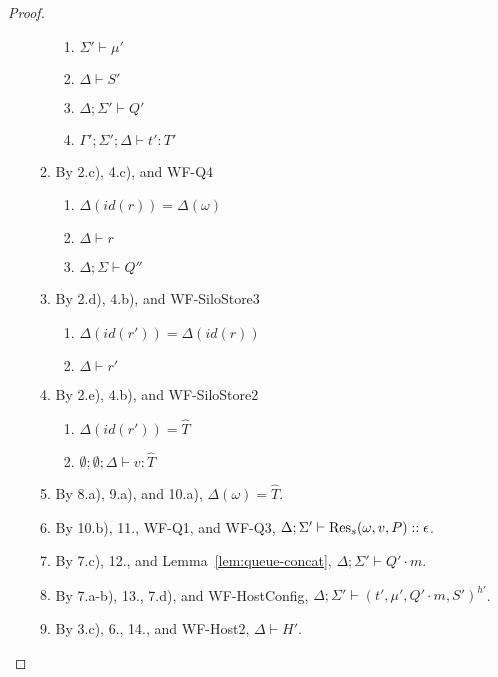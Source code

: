 \begin{proof}
\begin{itemize}
\begin{enumerate}
  \begin{enumerate}[label=(\alph*)]
  \item $\Sigma' \vdash \mu'$
  \item $\Delta \vdash S'$
  \item $\Delta ; \Sigma' \vdash Q'$
  \item $\Gamma' ; \Sigma' ; \Delta \vdash t' : T'$
  \end{enumerate}
\item By 2.c), 4.c), and WF-Q4
  \begin{enumerate}[label=(\alph*)]
  \item $\Delta(id(r)) = \Delta(\omega)$
  \item $\Delta \vdash r$
  \item $\Delta ; \Sigma \vdash Q''$
  \end{enumerate}
\item By 2.d), 4.b), and WF-SiloStore3
  \begin{enumerate}[label=(\alph*)]
  \item $\Delta(id(r')) = \Delta(id(r))$
  \item $\Delta \vdash r'$
  \end{enumerate}
\item By 2.e), 4.b), and WF-SiloStore2
  \begin{enumerate}[label=(\alph*)]
  \item $\Delta(id(r')) = \hat{T}$
  \item $\emptyset ; \emptyset ; \Delta \vdash v : \hat{T}$
  \end{enumerate}
\item By 8.a), 9.a), and 10.a), $\Delta(\omega) = \hat{T}$.
\item By 10.b), 11., WF-Q1, and WF-Q3, $\Delta ; \Sigma' \vdash {\textrm{Res}_s(\omega, v, P)} :: \epsilon$.
\item By 7.c), 12., and Lemma~\ref{lem:queue-concat}, $\Delta ; \Sigma' \vdash Q' \cdot m$.
\item By 7.a-b), 13., 7.d), and WF-HostConfig, $\Delta ; \Sigma' \vdash (t', \mu', Q' \cdot m, S')^{h'}$.
\item By 3.c), 6., 14., and WF-Host2, $\Delta \vdash H'$.
\end{enumerate}


\end{itemize}
\end{proof}
